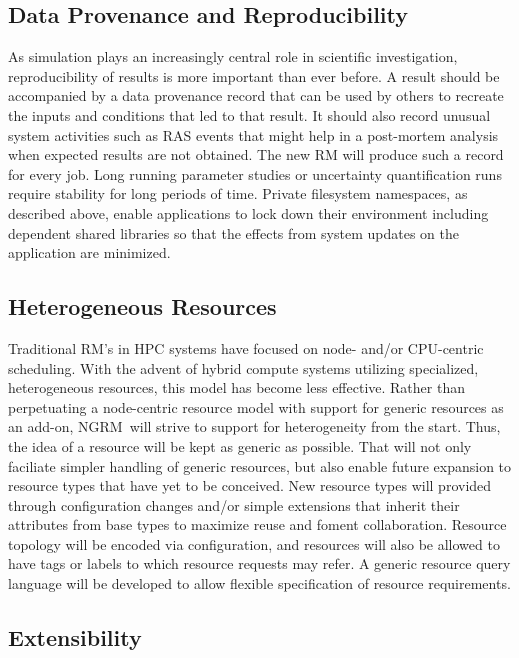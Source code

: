 \documentclass{article}
\newcommand{\ngrm}{NGRM}
\begin{document}

\subsection{Data Provenance and Reproducibility}

As simulation plays an increasingly central role in scientific
investigation, reproducibility of results is more important than ever
before. A result should be accompanied by a data provenance record that
can be used by others to recreate the inputs and conditions that led to
that result. It should also record unusual system activities 
such as RAS events that might help in a post-mortem analysis 
when expected results are not obtained.
The new RM will produce such a record for every job.
Long running parameter studies or uncertainty quantification runs
require stability for long periods of time. Private filesystem
namespaces, as described above, enable applications to lock down their
environment including dependent shared libraries so that the effects from
system updates on the application are minimized.

\subsection{Heterogeneous Resources}

Traditional RM's in HPC systems have focused on node- and/or CPU-centric
scheduling. With the advent of hybrid compute systems utilizing specialized,
heterogeneous resources, this model has become less effective. Rather than
perpetuating a node-centric resource model with support for generic
resources as an add-on, \ngrm\ will strive to support for heterogeneity
from the start.
Thus, the idea of a resource will be kept as generic as
possible. That will not only faciliate simpler handling of generic resources,
but also enable future expansion to resource types that have yet to
be conceived. New resource types will provided through configuration changes
and/or simple extensions that inherit their attributes from base types 
to maximize reuse and foment collaboration.  Resource topology will be encoded via
configuration, and resources will also be allowed to have tags or labels
to which resource requests may refer. 
A generic resource query language will be developed to allow flexible
specification of resource requirements.

\subsection{Extensibility}
\end{document}
